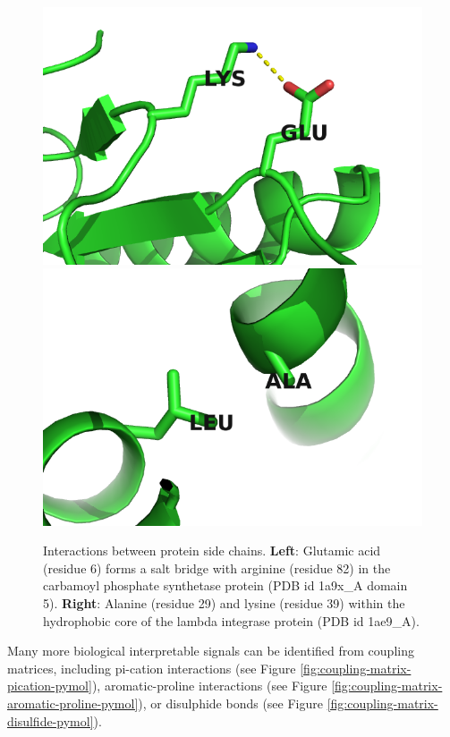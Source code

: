 \documentclass[11pt,a4paper,twoside]{book}
\theoremstyle{definition}
\theoremstyle{definition}
\theoremstyle{remark}
\begin{document}
\begin{figure}
\includegraphics[width=0.5\linewidth]{img/coupling_matrix_analysis/1a9xA05_6_82} \includegraphics[width=0.5\linewidth]{img/coupling_matrix_analysis/1ae9A00_29_39} \caption{Interactions between protein side
chains. \textbf{Left}: Glutamic acid (residue 6) forms a salt bridge
with arginine (residue 82) in the carbamoyl phosphate synthetase protein
(PDB id 1a9x\_A domain 5). \textbf{Right}: Alanine (residue 29) and
lysine (residue 39) within the hydrophobic core of the lambda integrase
protein (PDB id 1ae9\_A).}\label{fig:coupling-matrix-pymol}
\end{figure}

Many more biological interpretable signals can be identified from
coupling matrices, including pi-cation interactions (see Figure
\ref{fig:coupling-matrix-pication-pymol}), aromatic-proline interactions
(see Figure \ref{fig:coupling-matrix-aromatic-proline-pymol}), or
disulphide bonds (see Figure \ref{fig:coupling-matrix-disulfide-pymol}).
\end{document}
